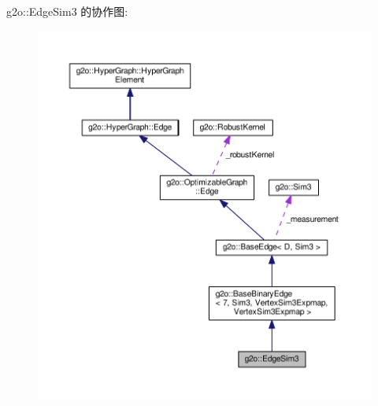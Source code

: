 g2o\-:\-:Edge\-Sim3 的协作图\-:
\nopagebreak
\begin{figure}[H]
\begin{center}
\leavevmode
\includegraphics[width=350pt]{classg2o_1_1EdgeSim3__coll__graph}
\end{center}
\end{figure}
